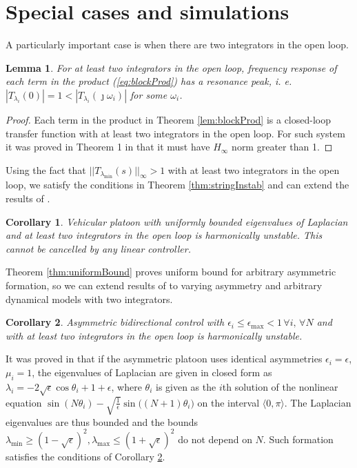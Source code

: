 \documentclass[technote, 10pt, twoside]{IEEEtran}
\newcommand{\wn}{i}
\newcommand{\numVeh}{N}
\newcommand{\spatEig}{\lambda} \newcommand{\spatEigWn}{\lambda_\wn}
\newcommand{\spatEigMin}{\spatEig_{\min}}
\newcommand{\spatEigMax}{\spatEig_{\max}}
\newcommand{\spatFreqWn}{\theta_\wn} \newcommand{\matJ}{{J}}
\newcommand{\diagTransBlockEig}{T}
\newcommand{\diagTransBlockEigWn}{\diagTransBlockEig_{\spatEigWn}}
\newcommand{\diagTransBlockEigMin}{\diagTransBlockEig_{\spatEig_{\min}}}
\theoremstyle{plain}
\newtheorem{lemma}{Lemma}
\newtheorem{corollary}{Corollary}
\theoremstyle{definition}
\theoremstyle{assump}
\begin{document}
\section{Special cases and simulations}
A particularly important case is when there are two integrators in the open
loop.
\begin{lemma}
	For at least two integrators in the open loop, frequency response of each term 	in the product (\ref{eq:blockProd}) has a resonance peak, i. e. $|\diagTransBlockEigWn(0)|=1 < |\diagTransBlockEigWn(\jmath \omega_\wn)|$ for some $\omega_\wn$.
	\label{lem:overshoot}
\end{lemma}
\begin{proof}
	Each term in the product in Theorem \ref{lem:blockProd} is a closed-loop
	transfer function with at least two integrators in the open loop. For such system it was proved in Theorem 1 in \cite{Seiler2004a} that it must have $H_\infty$ norm greater than 1. 
\end{proof} 
Using the fact that $||\diagTransBlockEigMin(s)||_\infty > 1$ with at least two
integrators in the open loop, we satisfy the
conditions in Theorem \ref{thm:stringInstab} and can extend the results of
\cite{Seiler2004a}.
\begin{corollary}
	Vehicular platoon with uniformly bounded eigenvalues of Laplacian and at least	two integrators in the open loop is harmonically unstable. This cannot be 	cancelled by any linear controller.
\end{corollary}

Theorem \ref{thm:uniformBound} proves uniform bound for arbitrary asymmetric formation, so we can extend results of \cite{Tangerman2012} to varying asymmetry
and arbitrary dynamical models with two integrators.
\begin{corollary}
	Asymmetric bidirectional control with $\epsilon_i \leq \epsilon_{\max} < 1 \,
	\forall i, \, \forall \numVeh$ and with at least two integrators in the open
	loop is harmonically unstable.
	\label{cor:asymHarmUnstable}
\end{corollary}
It was proved in \cite{Herman2013,Tangerman2012} that if the asymmetric platoon
uses identical asymmetries $\epsilon_i=\epsilon$, $\mu_i=1$, the eigenvalues of
Laplacian are given in closed form as $\spatEigWn = -2 \sqrt{\epsilon} \cos
\spatFreqWn + 1 + \epsilon$, where $\spatFreqWn$ is given as the $\wn$th
solution of the nonlinear equation $\sin(N\spatFreqWn) -
\sqrt{\frac{1}{\epsilon}} \sin \big((N+1) \spatFreqWn \big)$ on the interval
$\langle0, \pi\rangle$.  The Laplacian eigenvalues are thus bounded and the bounds
$\spatEigMin \geq (1 - \sqrt{\epsilon})^2, \spatEigMax \leq (1 + \sqrt{\epsilon})^2$ do not depend on $\numVeh$. Such formation satisfies the
conditions of Corollary \ref{cor:asymHarmUnstable}.
\end{document}
